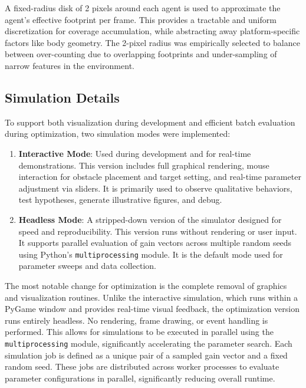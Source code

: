 \documentclass[12pt]{article}
\begin{document}
A fixed-radius disk of 2 pixels around each agent is used to approximate the agent's effective footprint per frame. This provides a tractable and uniform discretization for coverage accumulation, while abstracting away platform-specific factors like body geometry. The 2-pixel radius was empirically selected to balance between over-counting due to overlapping footprints and under-sampling of narrow features in the environment.


\subsection{Simulation Details}

To support both visualization during development and efficient batch evaluation during optimization, two simulation modes were implemented:

\begin{enumerate}[nosep]
    \item \textbf{Interactive Mode}: Used during development and for real-time demonstrations. This version includes full graphical rendering, mouse interaction for obstacle placement and target setting, and real-time parameter adjustment via sliders. It is primarily used to observe qualitative behaviors, test hypotheses, generate illustrative figures, and debug.
    \item \textbf{Headless Mode}: A stripped-down version of the simulator designed for speed and reproducibility. This version runs without rendering or user input. It supports parallel evaluation of gain vectors across multiple random seeds using Python's \texttt{multiprocessing} module. It is the default mode used for parameter sweeps and data collection.
\end{enumerate}

The most notable change for optimization is the complete removal of graphics and visualization routines. Unlike the interactive simulation, which runs within a PyGame window and provides real-time visual feedback, the optimization version runs entirely headless. No rendering, frame drawing, or event handling is performed. This allows for simulations to be executed in parallel using the \texttt{multiprocessing} module, significantly accelerating the parameter search. Each simulation job is defined as a unique pair of a sampled gain vector and a fixed random seed. These jobs are distributed across worker processes to evaluate parameter configurations in parallel, significantly reducing overall runtime.
\end{document}
